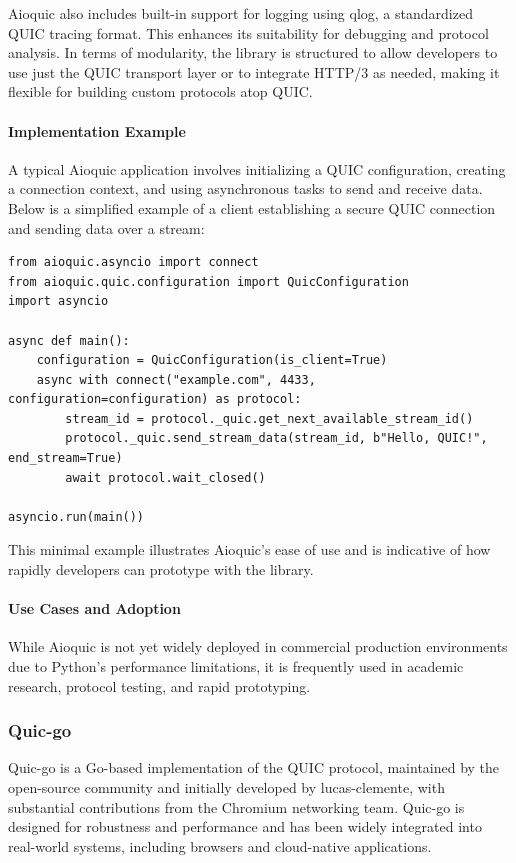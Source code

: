 Aioquic also includes built-in support for logging using qlog, a standardized QUIC tracing format. This enhances its suitability for debugging and protocol analysis. In terms of modularity, the library is structured to allow developers to use just the QUIC transport layer or to integrate HTTP/3 as needed, making it flexible for building custom protocols atop QUIC.

\paragraph{Implementation Example}
A typical Aioquic application involves initializing a QUIC configuration, creating a connection context, and using asynchronous tasks to send and receive data. Below is a simplified example of a client establishing a secure QUIC connection and sending data over a stream:

\begin{lstlisting}[breaklines=true,basicstyle=\small\ttfamily,frame=single]
from aioquic.asyncio import connect
from aioquic.quic.configuration import QuicConfiguration
import asyncio

async def main():
    configuration = QuicConfiguration(is_client=True)
    async with connect("example.com", 4433, configuration=configuration) as protocol:
        stream_id = protocol._quic.get_next_available_stream_id()
        protocol._quic.send_stream_data(stream_id, b"Hello, QUIC!", end_stream=True)
        await protocol.wait_closed()

asyncio.run(main())
\end{lstlisting}

This minimal example illustrates Aioquic's ease of use and is indicative of how rapidly developers can prototype with the library.

\paragraph{Use Cases and Adoption}
While Aioquic is not yet widely deployed in commercial production environments due to Python's performance limitations, it is frequently used in academic research, protocol testing, and rapid prototyping.

\subsubsection{Quic-go}
Quic-go is a Go-based implementation of the QUIC protocol, maintained by the open-source community and initially developed by lucas-clemente, with substantial contributions from the Chromium networking team. Quic-go is designed for robustness and performance and has been widely integrated into real-world systems, including browsers and cloud-native applications.

